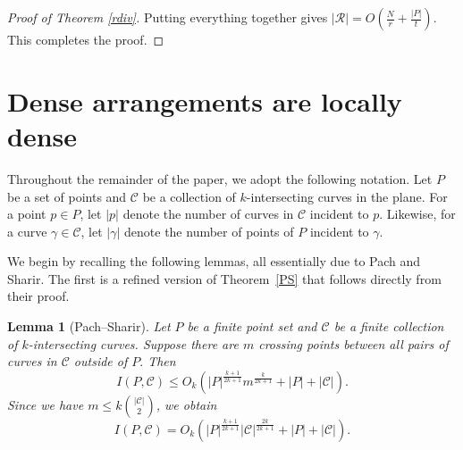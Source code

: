 \documentclass[11pt]{article}
\theoremstyle{plain}
\newtheorem{lemma}[theorem]{Lemma}
\theoremstyle{definition}
\theoremstyle{remark}
\begin{document}
\begin{proof}[Proof of Theorem \ref{rdiv}]
 


\noindent Putting everything together gives $
|\mathcal R| = O\!\left(\frac{N}{r}+\frac{|P|}{t}\right).$  This completes the proof.























     


\end{proof}




\section{Dense arrangements are locally dense}\label{sec:dense}





Throughout the remainder of the paper, we adopt the following notation. 
Let $P$ be a set of points and $\mathcal{C}$ be a collection of $k$-intersecting curves in the plane. 
For a point $p \in P$, let $|p|$ denote the number of curves in $\mathcal{C}$ incident to $p$. 
Likewise, for a curve $\gamma \in \mathcal{C}$, let $|\gamma|$ denote the number of points of $P$ incident to $\gamma$.  



We begin by recalling the following lemmas, all essentially due to Pach and Sharir. The first is a refined version of Theorem~\ref{PS} that follows directly from their proof.



\begin{lemma}[Pach--Sharir]\label{PSlemma}
Let \(P\) be a finite point set and $\mathcal C$ be a finite collection of $k$-intersecting curves.  Suppose there are $m$ crossing points between all pairs of curves in $\mathcal C$ outside of $P.$
Then
\[
I(P,\mathcal C)
\le
O_k\left(
|P|^{\frac{k + 1}{2k + 1}}
m^{\frac{k}{2k + 1}}
+|P|+|\mathcal  C|
\right).
\]
Since we have $m \leq k\binom{|\mathcal C|}{2}$, we obtain
\[
I(P,\mathcal{C}) = O_k\left(
|P|^{\frac{k + 1}{2k + 1}}
|\mathcal C|^{\frac{2k}{2k + 1}}
+|P|+|\mathcal  C|
\right).
\]  


\end{lemma}
                  
\end{document}
